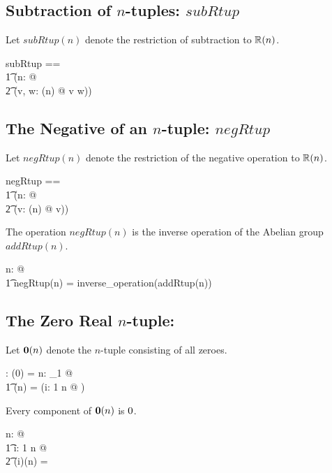 \documentclass[11pt, oneside]{article}
\begin{document}
\subsection{Subtraction of $n$-tuples: $subRtup$}

Let $subRtup(n)$ denote the restriction of subtraction to $\operatorname{\mathbb{R}}(n)$.

\begin{zed}
subRtup == \\
\t1	(\lambda n: \nat @ \\
\t2		(\lambda v, w: \Rtup(n) @ v \subRinf w))
\end{zed}

\subsection{The Negative of an $n$-tuple: $negRtup$}

Let $negRtup(n)$ denote the restriction of the negative operation to $\operatorname{\mathbb{R}}(n)$.

\begin{zed}
negRtup == \\
\t1	(\lambda n: \nat @ \\
\t2		(\lambda v: \Rtup(n) @ \negRinf v))
\end{zed}

\begin{remark}
The operation $negRtup(n)$ is the inverse operation of the Abelian group $addRtup(n)$.

\begin{zed}
\forall n: \nat @ \\
\t1	negRtup(n) = inverse\_operation(addRtup(n))
\end{zed}

\end{remark}


\subsection{The Zero Real $n$-tuple: }

Let $\operatorname{\mathbf{0}}(n)$ denote the $n$-tuple consisting of all zeroes.

\begin{axdef}
	\zeroRtup: \nat \fun \Rinf
\where
	\zeroRtup(0) = \langle \rangle
\also
	\forall n: \nat_1 @ \\
	\t1	\zeroRtup(n) = (\lambda i: 1 \upto n @ \zeroR)
\end{axdef}

\begin{remark}
Every component of $\operatorname{\mathbf{0}}(n)$ is $0$.

\begin{zed}
\forall n: \nat @ \\
\t1	\forall i: 1 \upto n @ \\
\t2	(\piRinf i)(\zeroRtup n) = \zeroR
\end{zed}

\end{remark}
\end{document}
